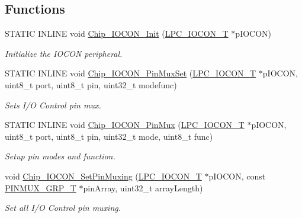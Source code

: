 \subsection*{Functions}
\begin{DoxyCompactItemize}
\item 
S\+T\+A\+T\+I\+C I\+N\+L\+I\+N\+E void \hyperlink{group___i_o_c_o_n__17_x_x__40_x_x_ga40283d81f5ad91ba8b47647059721c9d}{Chip\+\_\+\+I\+O\+C\+O\+N\+\_\+\+Init} (\hyperlink{struct_l_p_c___i_o_c_o_n___t}{L\+P\+C\+\_\+\+I\+O\+C\+O\+N\+\_\+\+T} $\ast$p\+I\+O\+C\+O\+N)
\begin{DoxyCompactList}\small\item\em Initialize the I\+O\+C\+O\+N peripheral. \end{DoxyCompactList}\item 
S\+T\+A\+T\+I\+C I\+N\+L\+I\+N\+E void \hyperlink{group___i_o_c_o_n__17_x_x__40_x_x_ga5db68254cabb0d4cd4558d81557b77e4}{Chip\+\_\+\+I\+O\+C\+O\+N\+\_\+\+Pin\+Mux\+Set} (\hyperlink{struct_l_p_c___i_o_c_o_n___t}{L\+P\+C\+\_\+\+I\+O\+C\+O\+N\+\_\+\+T} $\ast$p\+I\+O\+C\+O\+N, uint8\+\_\+t port, uint8\+\_\+t pin, uint32\+\_\+t modefunc)
\begin{DoxyCompactList}\small\item\em Sets I/\+O Control pin mux. \end{DoxyCompactList}\item 
S\+T\+A\+T\+I\+C I\+N\+L\+I\+N\+E void \hyperlink{group___i_o_c_o_n__17_x_x__40_x_x_gaa2f90b2873cda51e67b3a67d6cc92617}{Chip\+\_\+\+I\+O\+C\+O\+N\+\_\+\+Pin\+Mux} (\hyperlink{struct_l_p_c___i_o_c_o_n___t}{L\+P\+C\+\_\+\+I\+O\+C\+O\+N\+\_\+\+T} $\ast$p\+I\+O\+C\+O\+N, uint8\+\_\+t port, uint8\+\_\+t pin, uint32\+\_\+t mode, uint8\+\_\+t func)
\begin{DoxyCompactList}\small\item\em Setup pin modes and function. \end{DoxyCompactList}\item 
void \hyperlink{group___i_o_c_o_n__17_x_x__40_x_x_gad97c96e401016cf296e6d20454f1c522}{Chip\+\_\+\+I\+O\+C\+O\+N\+\_\+\+Set\+Pin\+Muxing} (\hyperlink{struct_l_p_c___i_o_c_o_n___t}{L\+P\+C\+\_\+\+I\+O\+C\+O\+N\+\_\+\+T} $\ast$p\+I\+O\+C\+O\+N, const \hyperlink{struct_p_i_n_m_u_x___g_r_p___t}{P\+I\+N\+M\+U\+X\+\_\+\+G\+R\+P\+\_\+\+T} $\ast$pin\+Array, uint32\+\_\+t array\+Length)
\begin{DoxyCompactList}\small\item\em Set all I/\+O Control pin muxing. \end{DoxyCompactList}\end{DoxyCompactItemize}



